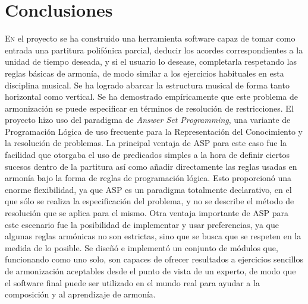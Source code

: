 \chapter{Conclusiones}
\label{chap:conclusiones}
\vspace{0.5cm}

\lettrine{E}{n} el proyecto se ha construido una herramienta software capaz de tomar como entrada una partitura polifónica parcial, deducir los acordes correspondientes a la unidad de tiempo deseada, y si el usuario lo desease, completarla respetando las reglas básicas de armonía, de modo similar a los ejercicios habituales en esta disciplina musical. Se ha logrado abarcar la estructura musical de forma tanto horizontal como vertical. Se ha demostrado empíricamente que este problema de armonización se puede especificar en términos de resolución de restricciones. El proyecto hizo uso del paradigma de \textit{Answer Set Programming}, una variante de Programación Lógica de uso frecuente para la Representación del Conocimiento y la resolución de problemas. La principal ventaja de ASP para este caso fue la facilidad que otorgaba el uso de predicados simples a la hora de definir ciertos sucesos dentro de la partitura así como añadir directamente las reglas usadas en armonía bajo la forma de reglas de programación lógica. Esto proporcionó una enorme flexibilidad, ya que ASP es un paradigma totalmente declarativo, en el que sólo se realiza la especificación del problema, y no se describe el método de resolución que se aplica para el mismo. Otra ventaja importante de ASP para este escenario fue la posibilidad de implementar y usar preferencias, ya que algunas reglas armónicas no son estrictas, sino que se busca que se respeten en la medida de lo posible. Se diseñó e implementó un conjunto de módulos que, funcionando como uno solo, son capaces de ofrecer resultados a ejercicios sencillos de armonización aceptables desde el punto de vista de un experto, de modo que el software final puede ser utilizado en el mundo real para ayudar a la composición y al aprendizaje de armonía.

